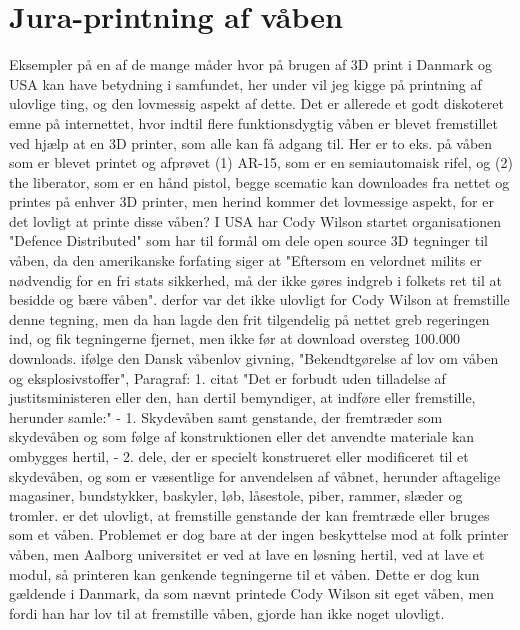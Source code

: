 \chapter{Jura-printning af våben}
Eksempler på en af de mange måder hvor på brugen af 3D print i Danmark og USA kan have betydning i samfundet, her under vil jeg kigge på printning af ulovlige ting, og den lovmessig aspekt af dette. Det er allerede et godt diskoteret emne på internettet, hvor indtil flere funktionsdygtig våben er blevet fremstillet ved hjælp at en 3D printer, som alle kan få adgang til. Her er to eks. på våben som er blevet printet og afprøvet (1) AR-15, som er en semiautomaisk rifel, og (2) the liberator, som er en hånd pistol, begge scematic kan downloades fra nettet og printes på enhver 3D printer, men herind kommer det lovmessige aspekt, for er det lovligt at printe disse våben?
I USA har Cody Wilson startet organisationen "Defence Distributed" som har til formål om dele open source 3D tegninger til våben, da den amerikanske forfating siger at "Eftersom en velordnet milits er nødvendig for en fri stats sikkerhed, må der ikke gøres indgreb i folkets ret til at besidde og bære våben". derfor var det ikke ulovligt for Cody Wilson at fremstille denne tegning, men da han lagde den frit tilgendelig på nettet greb regeringen ind, og fik tegningerne fjernet, men ikke før at download oversteg 100.000 downloads.
ifølge den Dansk våbenlov givning, "Bekendtgørelse af lov om våben og eksplosivstoffer", 
Paragraf: 1. citat "Det er forbudt uden tilladelse af justitsministeren eller den, han dertil bemyndiger, at indføre eller fremstille, herunder samle:" 
- 1. Skydevåben samt genstande, der fremtræder som skydevåben og som følge af konstruktionen eller det anvendte materiale kan ombygges hertil,
- 2. dele, der er specielt konstrueret eller modificeret til et skydevåben, og som er væsentlige for anvendelsen af våbnet, herunder aftagelige magasiner, bundstykker, baskyler, løb, låsestole, piber, rammer, slæder og tromler.
er det ulovligt, at fremstille genstande der kan fremtræde eller bruges som et våben. Problemet er dog bare at der ingen beskyttelse mod at folk printer våben, men Aalborg universitet er ved at lave en løsning hertil, ved at lave et modul, så printeren kan genkende tegningerne til et våben. Dette er dog kun gældende i Danmark, da som nævnt printede Cody Wilson sit eget våben, men fordi han har lov til at fremstille våben, gjorde han ikke noget ulovligt. 